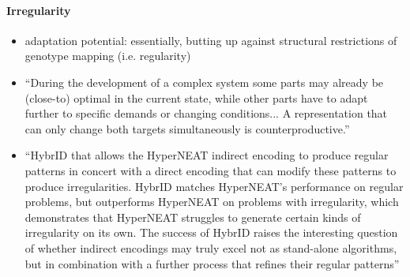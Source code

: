 \paragraph{Irregularity}
  \begin{itemize}
    \item adaptation potential: essentially, butting up against structural restrictions of genotype mapping (i.e. regularity)
    \item ``During the development of a complex system some parts may already be (close-to) optimal in the current state, while other parts have to adapt further to specific demands or changing conditions... A representation that can only change both targets simultaneously is counterproductive.'' \cite{Richter2015EvolvabilitySurvey}
    \item ``HybrID that allows the HyperNEAT indirect encoding to produce regular patterns in concert with a direct encoding that can modify these patterns to produce irregularities. HybrID matches HyperNEAT’s performance on regular problems, but outperforms HyperNEAT on problems with irregularity, which demonstrates that HyperNEAT struggles to generate certain kinds of irregularity on its own. The success of HybrID raises the interesting question of whether indirect encodings may truly excel not as stand-alone algorithms, but in combination with a further process that refines their regular patterns'' \cite{Clune2011OnRegularity}
  \end{itemize}